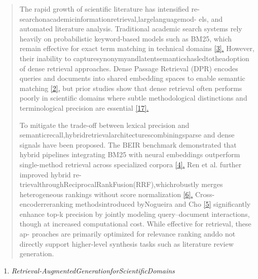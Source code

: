 \documentclass[
]{article}
\begin{document}
\begin{quote}
The rapid growth of scientific literature has intensified re- searchonacademicinformationretrieval,largelanguagemod- els, and automated literature analysis. Traditional academic search systems rely heavily on probabilistic keyword-based models such as BM25, which remain effective for exact term matching in technical domains \hyperref[_bookmark23]{{[}3{]}.} However, their inability to capturesynonymyandlatentsemanticshasledtotheadoption of dense retrieval approaches. Dense Passage Retrieval (DPR) encodes queries and documents into shared embedding spaces to enable semantic matching \hyperref[_bookmark22]{{[}2{]},} but prior studies show that dense retrieval often performs poorly in scientific domains where subtle methodological distinctions and terminological precision are essential \hyperref[_bookmark33]{{[}17{]}.}

To mitigate the trade-off between lexical precision and semanticrecall,hybridretrievalarchitecturescombiningsparse and dense signals have been proposed. The BEIR benchmark demonstrated that hybrid pipelines integrating BM25 with neural embeddings outperform single-method retrieval across specialized corpora \hyperref[_bookmark24]{{[}4{]}.} Ren et al. further improved hybrid re- trievalthroughReciprocalRankFusion(RRF),whichrobustly merges heterogeneous rankings without score normalization \hyperref[_bookmark26]{{[}6{]}.} Cross-encoderreranking methodsintroduced byNogueira and Cho \hyperref[_bookmark25]{{[}5{]}} significantly enhance top-k precision by jointly modeling query--document interactions, though at increased computational cost. While effective for retrieval, these ap- proaches are primarily optimized for relevance ranking anddo not directly support higher-level synthesis tasks such as literature review generation.
\end{quote}

\begin{enumerate}
\def\labelenumi{\Alph{enumi}.}
\setcounter{enumi}{1}
\item
  \emph{Retrieval-AugmentedGenerationforScientificDomains}
\end{enumerate}
\end{document}
